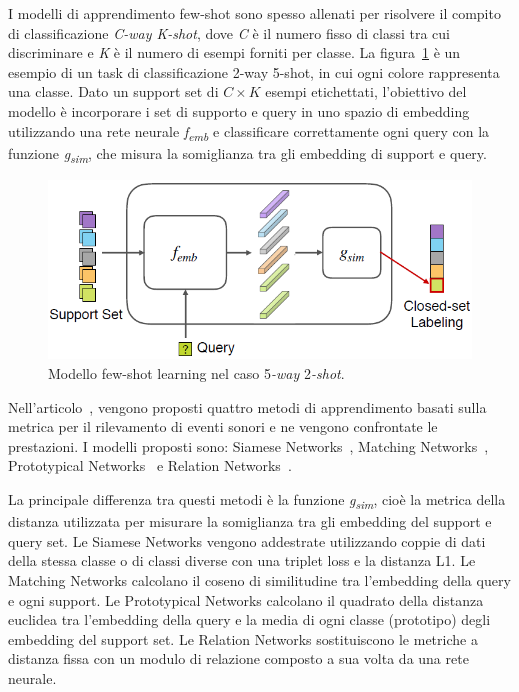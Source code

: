 \documentclass[12pt,a4paper,titlepage]{article}
\begin{document}
I modelli di apprendimento few-shot sono spesso allenati per risolvere il compito di classificazione \textit{C-way K-shot}, dove \textit{C} è il numero fisso di classi tra cui discriminare e \textit{K} è il numero di esempi forniti per classe. La figura~\ref{fig:few-shot_learning_model} è un esempio di un task di classificazione 2-way 5-shot, in cui ogni colore rappresenta una classe. Dato un support set di $C \times K$ esempi etichettati, l'obiettivo del modello è incorporare i set di supporto e query in uno spazio di embedding utilizzando una rete neurale \textit{f\textsubscript{emb}} e classificare correttamente ogni query con la funzione \textit{g\textsubscript{sim}}, che misura la somiglianza tra gli embedding di support e query.

\begin{figure}[h]
	\centering	
	\includegraphics[width=.7\textwidth]{Immagini/few_shot_learning_model}
	\caption{Modello few-shot learning nel caso 5\emph{-way} 2\emph{-shot}.~\cite{salamon:Few-Shot}}
	\label{fig:few-shot_learning_model}
\end{figure}

Nell'articolo~\cite{salamon:Few-Shot}, vengono proposti quattro metodi di apprendimento basati sulla metrica per il rilevamento di eventi sonori e ne vengono confrontate le prestazioni. I modelli proposti sono: Siamese Networks~\cite{koch:siamese}, Matching Networks~\cite{vinyals:matching}, Prototypical Networks~\cite{snell:prototypical} e Relation Networks~\cite{sung:relation}. 

La principale differenza tra questi metodi è la funzione \textit{g\textsubscript{sim}}, cioè la metrica della distanza utilizzata per misurare la somiglianza tra gli embedding del support e query set. Le Siamese Networks vengono addestrate utilizzando coppie di dati della stessa classe o di classi diverse con una triplet loss e la distanza L1. Le Matching Networks calcolano il coseno di similitudine tra l'embedding della query e ogni support. Le Prototypical Networks calcolano il quadrato della distanza euclidea tra l'embedding della query e la media di ogni classe (prototipo) degli embedding del support set. Le Relation Networks sostituiscono le metriche a distanza fissa con un modulo di relazione composto a sua volta da una rete neurale.
\end{document}
